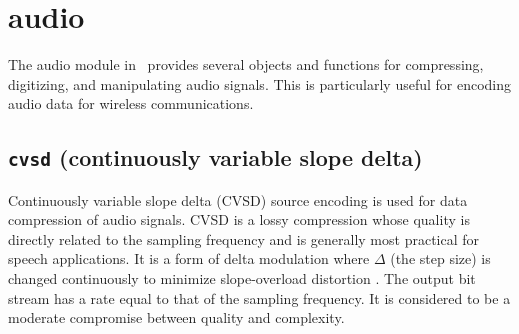 % 
%

\newpage
\section{audio}
\label{module:audio}
The audio module in \liquid\ provides several objects and functions for
compressing, digitizing, and manipulating audio signals.
This is particularly useful for encoding audio data for wireless
communications.

\subsection{{\tt cvsd} (continuously variable slope delta)}
\label{module:audio:cvsd}
Continuously variable slope delta (CVSD) source encoding is used for data
compression of audio signals.
CVSD is a lossy compression whose quality is directly related to the sampling
frequency and is generally most practical for speech applications.
It is a form of delta modulation where $\Delta$ (the step size) is changed
continuously to minimize slope-overload distortion \cite[p. 131]{Proakis:2001}.
The output bit stream has a rate equal to that of the sampling frequency.
It is considered to be a moderate compromise between quality and complexity.

